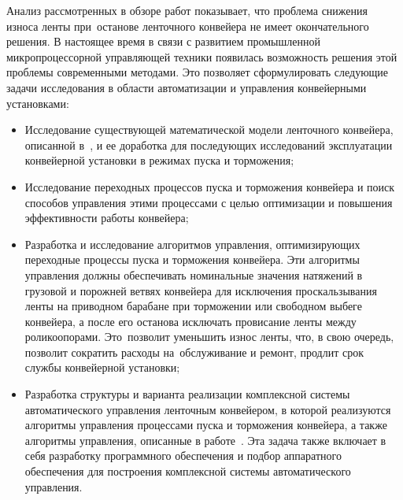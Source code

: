 Анализ рассмотренных в обзоре работ показывает, что проблема снижения износа ленты при~останове ленточного конвейера не имеет окончательного решения. В настоящее время в связи с развитием промышленной микропроцессорной управляющей техники появилась возможность решения этой проблемы современными методами. Это позволяет сформулировать следующие задачи исследования в области автоматизации и управления конвейерными установками:
\begin{itemize}
\item  Исследование существующей математической модели ленточного конвейера, описанной в~\cite{vdmitrieva1}, и ее доработка для последующих исследований эксплуатации конвейерной установки в режимах пуска и торможения;
\item Исследование переходных процессов пуска и торможения конвейера и поиск способов управления этими процессами с целью оптимизации и повышения эффективности работы конвейера;
\item Разработка и исследование алгоритмов управления, оптимизирующих переходные процессы пуска и торможения конвейера. Эти алгоритмы управления должны обеспечивать номинальные значения натяжений в грузовой и порожней ветвях конвейера для исключения проскальзывания ленты на приводном барабане при торможении или свободном выбеге конвейера, а после его останова исключать провисание ленты между роликоопорами. Это~позволит уменьшить износ ленты, что, в свою очередь, позволит сократить расходы на~обслуживание и ремонт, продлит срок службы конвейерной установки;
\item Разработка структуры и варианта реализации комплексной системы автоматического управления ленточным конвейером, в которой реализуются алгоритмы управления процессами пуска и торможения конвейера, а также алгоритмы управления, описанные в работе~\cite{vdmitrieva}. Эта задача также включает в себя разработку программного обеспечения и подбор аппаратного обеспечения для построения комплексной системы автоматического управления.
\end{itemize}
